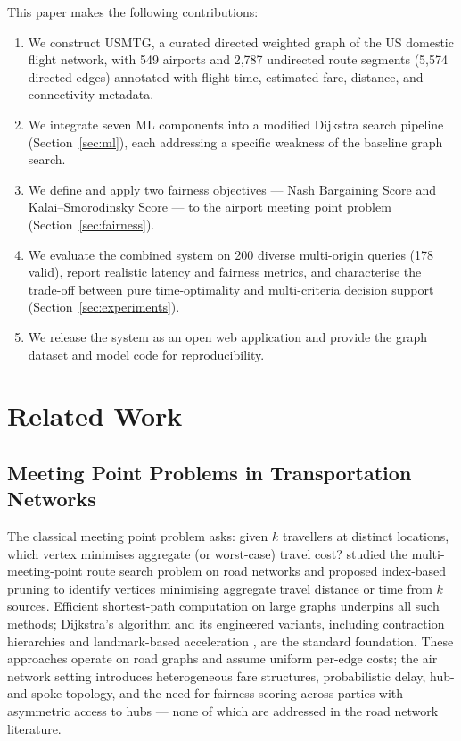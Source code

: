 \documentclass[review]{elsarticle}
\begin{document}
This paper makes the following contributions:
\begin{enumerate}
    \item We construct USMTG, a curated directed weighted graph of the US domestic flight network, with 549 airports and 2,787 undirected route segments (5,574 directed edges) annotated with flight time, estimated fare, distance, and connectivity metadata.
    \item We integrate seven ML components into a modified Dijkstra search pipeline (Section~\ref{sec:ml}), each addressing a specific weakness of the baseline graph search.
    \item We define and apply two fairness objectives — Nash Bargaining Score and Kalai--Smorodinsky Score — to the airport meeting point problem (Section~\ref{sec:fairness}).
    \item We evaluate the combined system on 200 diverse multi-origin queries (178 valid), report realistic latency and fairness metrics, and characterise the trade-off between pure time-optimality and multi-criteria decision support (Section~\ref{sec:experiments}).
    \item We release the system as an open web application and provide the graph dataset and model code for reproducibility.
\end{enumerate}

\section{Related Work}

\subsection{Meeting Point Problems in Transportation Networks}

The classical meeting point problem asks: given $k$ travellers at distinct locations, which vertex minimises aggregate (or worst-case) travel cost?
\citeauthor{li2016} \cite{li2016} studied the multi-meeting-point route search problem on road networks and proposed index-based pruning to identify vertices minimising aggregate travel distance or time from $k$ sources.
Efficient shortest-path computation on large graphs underpins all such methods; Dijkstra's algorithm \cite{dijkstra1959,cormen2009} and its engineered variants, including contraction hierarchies \cite{geisberger2008} and landmark-based acceleration \cite{bast2016}, are the standard foundation.
These approaches operate on road graphs and assume uniform per-edge costs; the air network setting introduces heterogeneous fare structures, probabilistic delay, hub-and-spoke topology, and the need for fairness scoring across parties with asymmetric access to hubs --- none of which are addressed in the road network literature.
\end{document}
